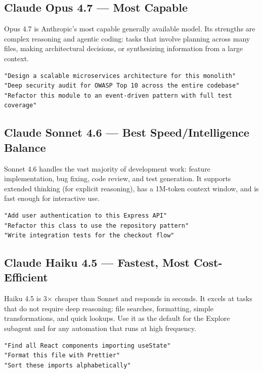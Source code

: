 \subsection{Claude Opus 4.7 — Most Capable}

Opus 4.7 is Anthropic's most capable generally available model.
Its strengths are complex reasoning and agentic coding: tasks that involve
planning across many files, making architectural decisions, or synthesizing
information from a large context.

\begin{lstlisting}[caption={Tasks suited to Opus 4.7}]
"Design a scalable microservices architecture for this monolith"
"Deep security audit for OWASP Top 10 across the entire codebase"
"Refactor this module to an event-driven pattern with full test coverage"
\end{lstlisting}

\subsection{Claude Sonnet 4.6 — Best Speed/Intelligence Balance}

Sonnet 4.6 handles the vast majority of development work: feature
implementation, bug fixing, code review, and test generation. It supports
extended thinking (for explicit reasoning), has a 1M-token context window,
and is fast enough for interactive use.

\begin{lstlisting}[caption={Tasks suited to Sonnet 4.6}]
"Add user authentication to this Express API"
"Refactor this class to use the repository pattern"
"Write integration tests for the checkout flow"
\end{lstlisting}

\subsection{Claude Haiku 4.5 — Fastest, Most Cost-Efficient}

Haiku 4.5 is 3× cheaper than Sonnet and responds in seconds. It excels at
tasks that do not require deep reasoning: file searches, formatting, simple
transformations, and quick lookups. Use it as the default for the Explore
subagent and for any automation that runs at high frequency.

\begin{lstlisting}[caption={Tasks suited to Haiku 4.5}]
"Find all React components importing useState"
"Format this file with Prettier"
"Sort these imports alphabetically"
\end{lstlisting}

